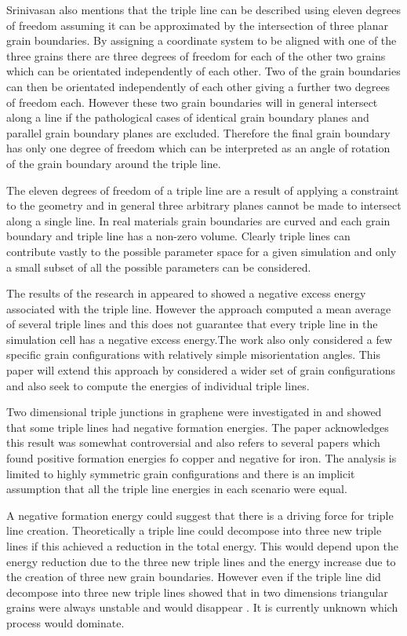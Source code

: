 \documentclass[12pt,a4paper]{book}
\begin{document}
Srinivasan also mentions that the triple line can be described using eleven degrees of freedom assuming it can be approximated by the intersection of three planar grain boundaries. By assigning a coordinate system to be aligned with one of the three grains there are three degrees of freedom for each of the other two grains which can be orientated independently of each other. Two of the grain boundaries can then be orientated independently of each other giving a further two degrees of freedom each. However these two grain boundaries will in general intersect along a line if the pathological cases of identical grain boundary planes and parallel grain boundary planes are excluded. Therefore the final grain boundary has only one degree of freedom which can be interpreted as an angle of rotation of the grain boundary around the triple line.

The eleven degrees of freedom of a triple line are a result of applying a constraint to the geometry and in general three arbitrary planes cannot be made to intersect along a single line.  In real materials grain boundaries are curved and each grain boundary and triple line has a non-zero volume. Clearly triple lines can contribute vastly to the possible parameter space for a given simulation and only a small subset of all the possible parameters can be considered.

The results of the research in \cite{Srinivasan1999} appeared to showed a negative excess energy associated with the triple line. However the approach computed a mean average of several triple lines and this does not guarantee that every triple line in the simulation cell has a negative excess energy.The work also only considered a few specific grain configurations with relatively simple misorientation angles. This paper will extend this approach by considered a wider set of grain configurations and also seek to compute the energies of individual triple lines.

Two dimensional triple junctions in graphene were  investigated in \citep{Hirvonen2017} and showed that some triple lines had negative formation energies. The paper acknowledges this result was somewhat controversial and also refers to several papers which found positive formation energies fo copper and negative for iron. The analysis is limited to highly symmetric grain configurations and there is an implicit assumption that all the triple line energies in each scenario were equal.

A negative formation energy could suggest that there is a driving force for triple line creation. Theoretically a triple line could decompose into three new triple lines if this achieved a reduction in the total energy. This would depend upon the energy reduction due to the three new triple lines and the energy increase due to the creation of three new grain boundaries. However even if the triple line did decompose into three new triple lines \citeauthor{Shvindlerman2005} showed that in two dimensions triangular grains were always unstable and would disappear \cite{Shvindlerman2005}. It is currently unknown which process would dominate. 
\end{document}
